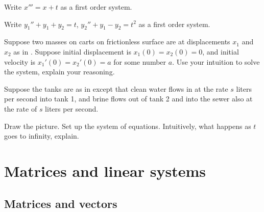 \begin{exercise}
Write $x''' = x+t$ as a first order system.
\end{exercise}

\begin{exercise}
Write $y_1'' + y_1 + y_2 = t$, 
$y_2'' + y_1 - y_2 = t^2$ as a first order system.
\end{exercise}

\begin{exercise}
Suppose two masses on carts on frictionless surface are at 
displacements $x_1$ and $x_2$ as in .
Suppose initial displacement is $x_1(0)=x_2(0)=0$, and initial velocity is $x_1'(0) = x_2'(0) = a$ for some number $a$.
Use your intuition
to solve the system, explain your reasoning.
\end{exercise}

\begin{exercise}
Suppose the tanks are as in 
 except that clean water flows in
at the rate $s$ liters per second into tank 1, and brine flows out of tank 2
and into the sewer also at the rate of $s$ liters per second.
\begin{tasks}
\task Draw the picture.
\task Set up the system of equations.
\task Intuitively, what happens as $t$ goes to infinity, explain.
\end{tasks}
\end{exercise}


\sectionnewpage
\section{Matrices and linear systems} \label{sec:matrix}


\subsection{Matrices and vectors}

